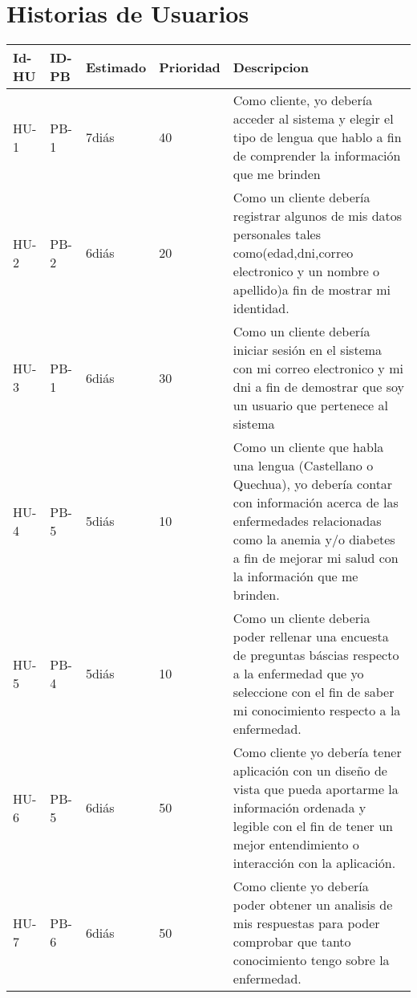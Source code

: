 \chapter{Historias de Usuarios}
\begin{table}[htbp]
	\begin{center}
		\begin{tabular}{| p{1.6cm}| p{1.8cm}| p{1.8cm}|p{1.8cm} |p{7.8cm} |}
			\hline
			\textbf{Id-HU} & \textbf{ID-PB} & \textbf {Estimado}& \textbf{Prioridad} & \textbf{Descripcion}
			\\\hline  
			HU-1&PB-1& 7diás& 40&Como cliente, yo debería acceder al sistema y elegir el tipo de lengua que hablo a fin de comprender la información que me brinden
			\\ \hline
			HU-2&PB-2& 6diás& 20&Como un cliente debería registrar algunos de mis datos personales tales como(edad,dni,correo electronico y un nombre o apellido)a fin de mostrar mi identidad.
			\\ \hline
			HU-3&PB-1& 6diás& 30&Como un cliente debería iniciar sesión en el sistema con mi correo electronico y mi dni a fin de demostrar que soy un usuario que pertenece al sistema 
			\\ \hline
			HU-4&PB-5& 5diás& 10&Como un cliente que habla una lengua (Castellano o Quechua), yo debería contar con información acerca de las enfermedades relacionadas como la anemia y/o diabetes a fin de mejorar mi salud con la información que me brinden. 
			\\ \hline
			HU-5&PB-4& 5diás& 10&Como un cliente deberia poder rellenar una encuesta de preguntas báscias respecto a la enfermedad que yo seleccione con el fin de saber mi conocimiento respecto a la enfermedad. 
			\\ \hline
			HU-6&PB-5& 6diás&50&Como cliente yo debería tener aplicación con un diseño de vista que pueda aportarme la información ordenada y legible con el fin de tener un mejor entendimiento o interacción con la aplicación.
			\\ \hline
			HU-7&PB-6& 6diás&50&Como cliente yo debería poder obtener un analisis de mis respuestas para poder comprobar que tanto conocimiento tengo sobre la enfermedad.
			\\ \hline
		\end{tabular}
	\end{center}
\end{table}